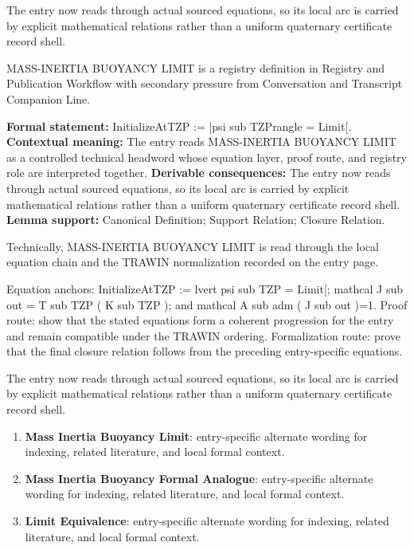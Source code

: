 The entry now reads through actual sourced equations, so its local arc is carried by explicit mathematical relations rather than a uniform quaternary certificate record shell.
\clearpage


\begingroup\small
{}
MASS-INERTIA BUOYANCY LIMIT is a registry definition in Registry and Publication Workflow with secondary pressure from Conversation and Transcript Companion Line.

\begingroup\footnotesize\setlength{\emergencystretch}{3em}\sloppy
\textbf{Formal statement:} InitializeAtTZP := |psi sub TZPrangle = Limit[. \textbf{Contextual meaning:} The entry reads MASS-INERTIA BUOYANCY LIMIT as a controlled technical headword whose equation layer, proof route, and registry role are interpreted together. \textbf{Derivable consequences:} The entry now reads through actual sourced equations, so its local arc is carried by explicit mathematical relations rather than a uniform quaternary certificate record shell. \textbf{Lemma support:} Canonical Definition; Support Relation; Closure Relation.\par
\endgroup

Technically, MASS-INERTIA BUOYANCY LIMIT is read through the local equation chain and the TRAWIN normalization recorded on the entry page.

Equation anchors: InitializeAtTZP := lvert psi sub TZP = Limit[; mathcal J sub out = T sub TZP ( K sub TZP ); and mathcal A sub adm ( J sub out )=1. Proof route: show that the stated equations form a coherent progression for the entry and remain compatible under the TRAWIN ordering. Formalization route: prove that the final closure relation follows from the preceding entry-specific equations.

The entry now reads through actual sourced equations, so its local arc is carried by explicit mathematical relations rather than a uniform quaternary certificate record shell.
\endgroup

\begin{enumerate}[leftmargin=1.6em,itemsep=6pt,topsep=4pt]
\item \textbf{Mass Inertia Buoyancy Limit}: entry-specific alternate wording for indexing, related literature, and local formal context.
\item \textbf{Mass Inertia Buoyancy Formal Analogue}: entry-specific alternate wording for indexing, related literature, and local formal context.
\item \textbf{Limit Equivalence}: entry-specific alternate wording for indexing, related literature, and local formal context.
\end{enumerate}

